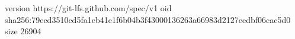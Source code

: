 version https://git-lfs.github.com/spec/v1
oid sha256:79ecd3510cd5fa1eb41e1f6b04b3f43000136263a66983d2127eedbf06cac5d0
size 26904

